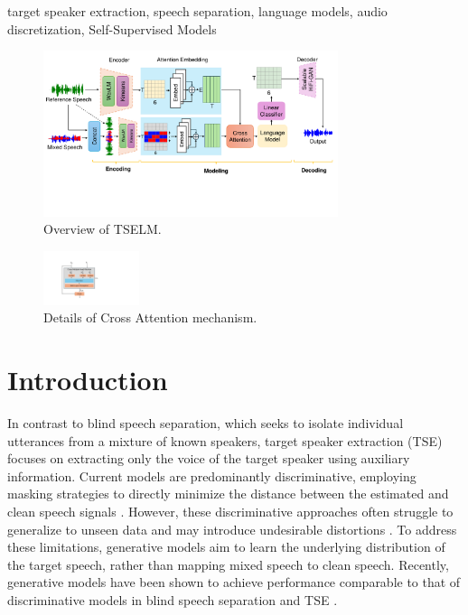\documentclass[conference]{IEEEtran}
\begin{document}
\begin{IEEEkeywords}
target speaker extraction, speech separation, language models, audio discretization, Self-Supervised Models
\end{IEEEkeywords}
\begin{figure}[t]
    \centering
    \includegraphics[width=0.77\textwidth]{assets/model.pdf}
    \caption{Overview of TSELM.}
    \label{model}
    \end{figure}

    \begin{figure}
        \centering
        \includegraphics[width=0.25\textwidth]{assets/cross_attention.pdf}
        \caption{Details of Cross Attention mechanism.}
        \label{cross_attention}
        \end{figure}


        
\section{Introduction}

In contrast to blind speech separation, which seeks to isolate individual utterances from a mixture of known speakers, target speaker extraction (TSE) focuses on extracting only the voice of the target speaker using auxiliary information. Current models are predominantly discriminative, employing masking strategies to directly minimize the distance between the estimated and clean speech signals \cite{luo2019conv,spex_plus,sepformer,sef_net}. However, these discriminative approaches often struggle to generalize to unseen data and may introduce undesirable distortions \cite{distortion}. To address these limitations, generative models aim to learn the underlying distribution of the target speech, rather than mapping mixed speech to clean speech. Recently, generative models have been shown to achieve performance comparable to that of discriminative models in blind speech separation \cite{tokensplit} and TSE \cite{target_diff}.
\end{document}
